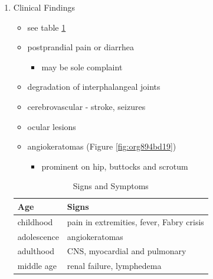 \documentclass{scrartcl}
\begin{document}
\begin{enumerate}
\item Clinical Findings
\label{sec:org7a6f4de}
\begin{itemize}
\item see table \ref{tab:org23d1ad6}
\item postprandial pain or diarrhea
\begin{itemize}
\item may be sole complaint
\end{itemize}
\item degradation of interphalangeal joints
\item cerebrovascular - stroke, seizures
\item ocular lesions
\item angiokeratomas (Figure \ref{fig:org894bd19})
\begin{itemize}
\item prominent on hip, buttocks and scrotum
\end{itemize}
\end{itemize}

\begin{table}[htbp]
\caption{\label{tab:org23d1ad6}
Signs and Symptoms}
\centering
\begin{tabular}{ll}
Age & Signs\\
\hline
childhood & pain in extremities, fever, Fabry crisis \footnotemark\\
adolescence & angiokeratomas\\
adulthood & CNS, myocardial and pulmonary\\
middle age & renal failure, lymphedema\\
\end{tabular}
\end{table}


\end{enumerate}
\end{document}
